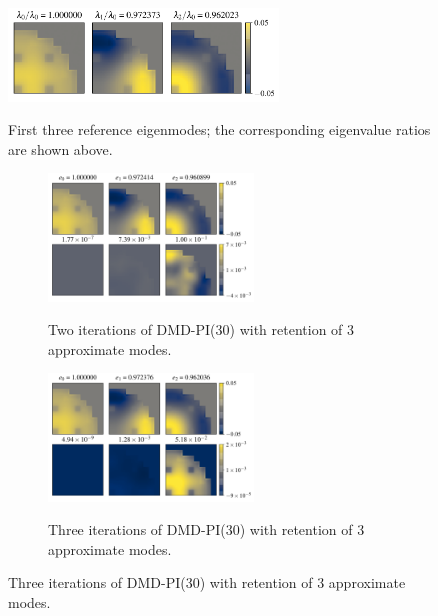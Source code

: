 \begin{figure}[htb]
 \centering
    \includegraphics[width=0.64\textwidth]{tex/figures/ref_modes.pdf}\\
    \caption{First three reference eigenmodes; the corresponding eigenvalue ratios are shown above.}
    \label{fig:ref_modes}
\end{figure}

\begin{figure}[!]
 \begin{subfigure}[b]{\textwidth}
  \centering
    \includegraphics[width=0.60\textwidth]{tex/figures/appx_modes_2_3.pdf}\\
    \caption{Two iterations of DMD-PI(30) with retention of 3 approximate modes.}
    \label{fig:appx_modes_2_3}
 \end{subfigure}
 
 \begin{subfigure}[b]{\textwidth}
  \centering
   \includegraphics[width=0.60\textwidth]{tex/figures/appx_modes_3_3.pdf}\\
   \caption{Three iterations of DMD-PI(30) with retention of 3 approximate modes.}
   \label{fig:appx_modes_3_3}
 \end{subfigure}
 

\end{figure}
